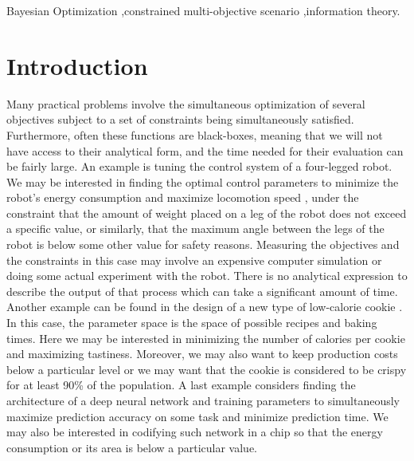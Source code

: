 \documentclass[review,preprint,12pt]{elsarticle}
\begin{document}
\begin{frontmatter}
\begin{keyword}
Bayesian Optimization \sep constrained multi-objective scenario \sep information theory. 
\end{keyword}

\end{frontmatter}

\section{Introduction}

Many practical problems involve the simultaneous optimization of several 
objectives subject to a set of constraints being simultaneously satisfied. 
Furthermore, often these functions are black-boxes, meaning that we will 
not have access to their analytical form, and the time needed for 
their evaluation can be fairly large. An example is tuning 
the control system of a four-legged robot. We may be interested in finding the optimal control parameters to minimize 
the robot's energy consumption and maximize locomotion speed \citep{ariizumi:2014}, under the constraint 
that the amount of weight placed on a leg of the robot does not exceed a specific value, or similarly, 
that the maximum angle between the legs of the robot is below some other value for safety 
reasons. Measuring the objectives and the constraints in this case may involve an expensive computer
simulation or doing some actual experiment with the robot. There is no analytical expression to 
describe the output of that process which can take a significant amount of time. Another example can 
be found in the design of a new type of low-calorie cookie \citep{gelbart2014bayesian}. In this case, 
the parameter space is the space of possible recipes and baking times. Here we may be interested 
in minimizing the number of calories per cookie and maximizing tastiness. Moreover, we may also want 
to keep production costs below a particular level or we may want that the cookie is considered 
to be crispy for at least 90\% of the population. A last example considers finding the architecture of 
a deep neural network and training parameters to simultaneously maximize prediction accuracy on some 
task and minimize prediction time. We may also be interested in codifying such network in a 
chip so that the energy consumption or its area is below a particular value. 
\end{document}
